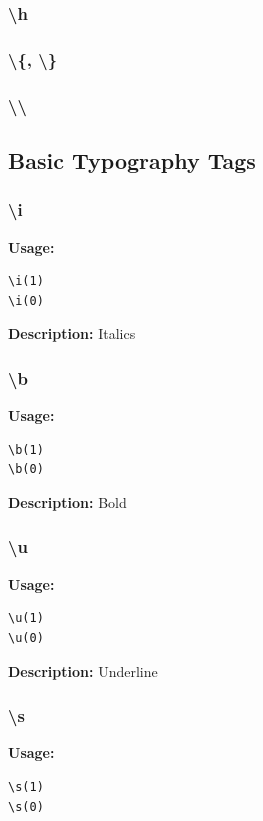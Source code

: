 \documentclass{spec}
\begin{document}
\subsubsection{\textbackslash h}

\subsubsection{\textbackslash \{, \textbackslash \}}

\subsubsection{\textbackslash \textbackslash}

\subsection{Basic Typography Tags}

\subsubsection{\textbackslash i}
\textbf{Usage:}
\begin{verbatim}
\i(1)
\i(0)
\end{verbatim}

\textbf{Description:}
Italics

\subsubsection{\textbackslash b}
\textbf{Usage:}
\begin{verbatim}
\b(1)
\b(0)
\end{verbatim}

\textbf{Description:}
Bold

\subsubsection{\textbackslash u}
\textbf{Usage:}
\begin{verbatim}
\u(1)
\u(0)
\end{verbatim}

\textbf{Description:}
Underline

\subsubsection{\textbackslash s}
\textbf{Usage:}
\begin{verbatim}
\s(1)
\s(0)
\end{verbatim}
\end{document}
